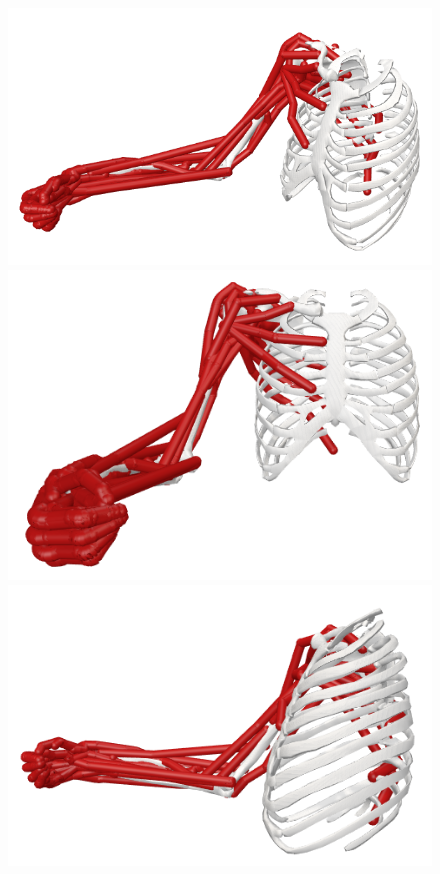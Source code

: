 \begin{figure}[!htb]
    \centering
    \captionsetup{justification=centering}
    \begin{minipage}{0.35\linewidth}
        \centering
        \includegraphics[trim={0 0 0 0}, clip, width=0.9\linewidth]{img/chapter_4/pose_8_view.png}
    \end{minipage}
    \hfill
    \begin{minipage}{0.35\linewidth}
        \captionsetup{justification=centering}
        \centering
        \includegraphics[trim={0 0 0 0}, clip, width=0.8\linewidth]{img/chapter_4/pose_8_front.png}
    \end{minipage}
    \hfill
    \begin{minipage}{0.25\linewidth}
        \captionsetup{justification=centering}
        \centering
        \includegraphics[trim={0 0 0 0}, clip, width=1\linewidth]{img/chapter_4/pose_8_side.png}

\end{minipage}
\end{figure}
